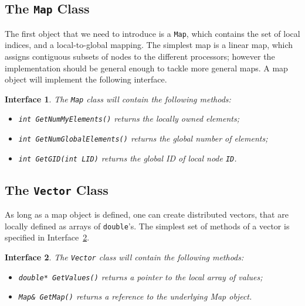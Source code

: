 \documentclass[acmtocl]{acmtrans2m}
\newtheorem{interface}{Interface}[section]
\begin{document}
\subsection{The {\tt Map} Class}

The first object that we need to introduce is a {\tt Map}, which contains the
set of local indices, and a local-to-global mapping. The simplest map is a
linear map, which assigns contiguous subsets of nodes to the different
processors; however the implementation should be general enough to tackle more
general maps. A map object will implement the following interface.

\begin{interface}
\label{int:map}
The {\tt Map} class will contain the following methods:

\begin{itemize}
\item {\tt int GetNumMyElements()} returns the locally owned elements;
\item {\tt int GetNumGlobalElements()} returns the global number of elements;
\item {\tt int GetGID(int LID)} returns the global ID of local node {\tt ID}.
\end{itemize}
\end{interface}

\subsection{The {\tt Vector} Class}

As long as a map object is defined, one can create distributed vectors, that
are locally defined as arrays of {\tt double}'s. The simplest set of methods
of a vector is specified in Interface~\ref{int:vector}.

\begin{interface}
\label{int:vector}
The {\tt Vector} class will contain the following methods:

\begin{itemize}
\item {\tt double* GetValues()} returns a pointer to the local array of values;
\item {\tt Map\& GetMap()} returns a reference to the underlying Map object.
\end{itemize}
\end{interface}
\end{document}
